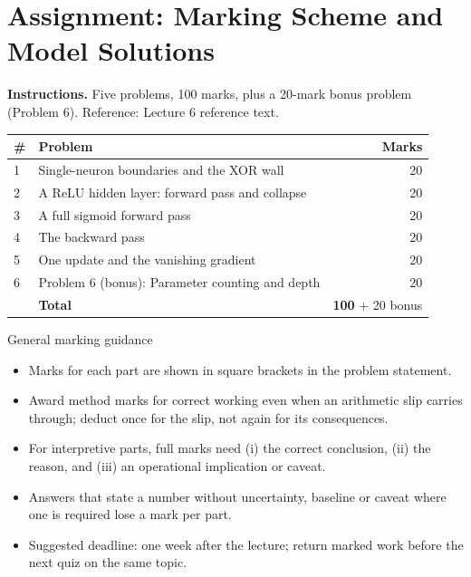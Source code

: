 \documentclass[11pt]{article}
\begin{document}
{}

\section{Assignment: Marking Scheme and Model Solutions}

\textbf{Instructions.} Five problems, 100 marks, plus a 20-mark bonus problem (Problem 6). Reference: Lecture 6 reference text.

\begin{center}\small\renewcommand{\arraystretch}{1.25}\begin{tabularx}{0.85\textwidth}{@{}l X r@{}}\toprule\textbf{\#} & \textbf{Problem} & \textbf{Marks}\\\midrule1 & Single-neuron boundaries and the XOR wall & 20\\
2 & A ReLU hidden layer: forward pass and collapse & 20\\
3 & A full sigmoid forward pass & 20\\
4 & The backward pass & 20\\
5 & One update and the vanishing gradient & 20\\
6 & Problem 6 (bonus): Parameter counting and depth & 20\\\midrule & \textbf{Total} & \textbf{100} + 20 bonus\\\bottomrule\end{tabularx}\end{center}

\begin{instr}{General marking guidance}\begin{itemize}
\item Marks for each part are shown in square brackets in the problem statement.
\item Award method marks for correct working even when an arithmetic slip carries through; deduct once for the slip, not again for its consequences.
\item For interpretive parts, full marks need (i) the correct conclusion, (ii) the reason, and (iii) an operational implication or caveat.
\item Answers that state a number without uncertainty, baseline or caveat where one is required lose a mark per part.
\item Suggested deadline: one week after the lecture; return marked work before the next quiz on the same topic.
\end{itemize}\end{instr}
\end{document}
